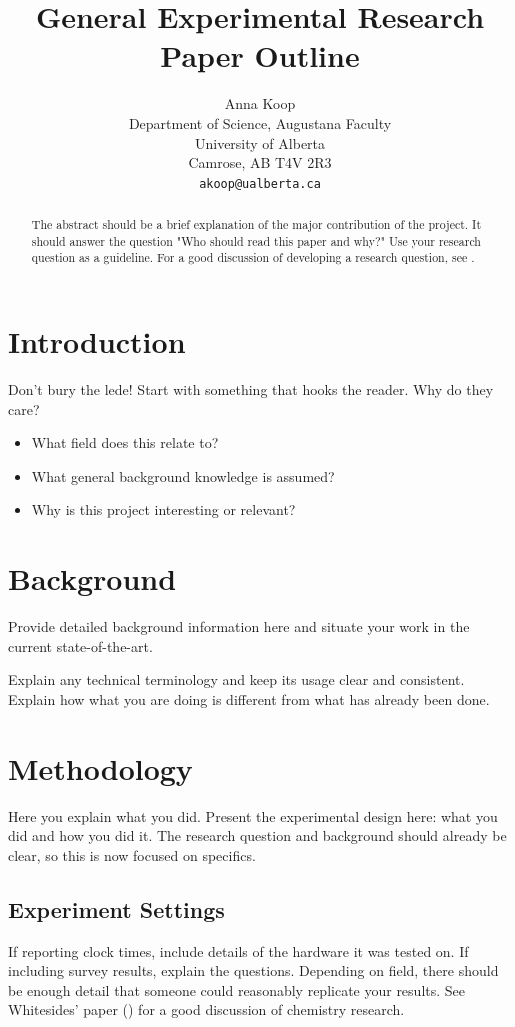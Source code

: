 \documentclass{article} %
\title{General Experimental Research Paper Outline}
\author{
Anna Koop\\
Department of Science, Augustana Faculty\\
University of Alberta\\
Camrose, AB T4V 2R3 \\
\texttt{akoop@ualberta.ca}
}
\begin{document}
\maketitle

\begin{abstract}
The abstract should be a brief explanation of the major contribution of the project. It should answer the question "Who should read this paper and why?" Use your research question as a guideline. For a good discussion of developing a research question, see \cite{Wright1999}.
\end{abstract}

\section{Introduction}
\label{sec:intro}
Don't bury the lede! Start with something that hooks the reader. Why do they care?

\begin{itemize}
\item What field does this relate to?
\item What general background knowledge is assumed?
\item Why is this project interesting or relevant?
\end{itemize}

\section{Background}
\label{sec:background}
Provide detailed background information here and situate your work in the current state-of-the-art.

Explain any technical terminology and keep its usage clear and consistent.
Explain how what you are doing is different from what has already been done.

\section{Methodology}
\label{sec:methods}
Here you explain what you did. Present the experimental design here: what you did and how you did it. The research question and background should already be clear, so this is now focused on specifics.

\subsection{Experiment Settings}
\label{sec:exp}
If reporting clock times, include details of the hardware it was tested on. If including survey results, explain the questions. Depending on field, there should be enough detail that someone could reasonably replicate your results. See Whitesides' paper (\cite{Whitesides2004}) for a good discussion of chemistry research.
\end{document}
